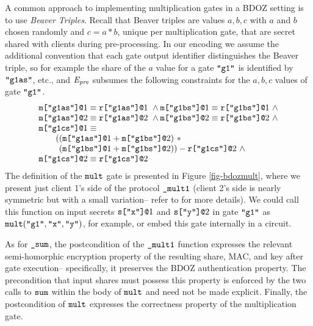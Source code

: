 A common approach to implementing multiplication gates in a BDOZ
setting is to use \emph{Beaver Triples}. Recall that Beaver triples
are values $a,b,c$ with $a$ and $b$ chosen randomly and $c = a * b$,
unique per multiplication gate, that are secret shared with clients
during pre-processing.  In our encoding we assume the additional
convention that each gate output identifier distinguishes the Beaver
triple, so for example the share of the $a$ value for a gate
$\texttt{"g1"}$ is identified by $\texttt{"g1as"}$, etc., and $\mathit{E}_{\mathit{pre}}$
subsumes the following constraints for the $a,b,c$ values of gate
$\texttt{"g1"}$.  {\footnotesize$$
\begin{array}{l}
\texttt{m[}\texttt{"g1as"}\texttt{]}\texttt{@}1 \equiv \texttt{r[}\texttt{"g1as"}\texttt{]}\texttt{@}1\ \wedge 
\texttt{m[}\texttt{"g1bs"}\texttt{]}\texttt{@}1 \equiv \texttt{r[}\texttt{"g1bs"}\texttt{]}\texttt{@}1\ \wedge\\
\texttt{m[}\texttt{"g1as"}\texttt{]}\texttt{@}2 \equiv \texttt{r[}\texttt{"g1as"}\texttt{]}\texttt{@}2\ \wedge 
\texttt{m[}\texttt{"g1bs"}\texttt{]}\texttt{@}2 \equiv \texttt{r[}\texttt{"g1bs"}\texttt{]}\texttt{@}2\ \wedge\\
\texttt{m[}\texttt{"g1cs"}\texttt{]}\texttt{@}1 \equiv \\
\qquad ((\texttt{m[}\texttt{"g1as"}\texttt{]}\texttt{@}1 + \texttt{m[}\texttt{"g1bs"}\texttt{]}\texttt{@}2)\ *\\
\qquad\phantom{(}(\texttt{m[}\texttt{"g1bs"}\texttt{]}\texttt{@}1 + \texttt{m[}\texttt{"g1bs"}\texttt{]}\texttt{@}2)) - \texttt{r[}\texttt{"g1cs"}\texttt{]}\texttt{@}2\ \wedge\\
\texttt{m[}\texttt{"g1cs"}\texttt{]}\texttt{@}2 \equiv \texttt{r[}\texttt{"g1cs"}\texttt{]}\texttt{@}2
\end{array}
$$}
The definition of the $\texttt{mult}$ gate is presented in Figure
\ref{fig-bdozmult}, where we present just client 1's side of the
protocol $\texttt{\_mult1}$ (client 2's side is nearly symmetric but with
a small variation-- refer to
\cite{evans2018pragmatic,10.1007/978-3-030-68869-1_3} for more
details).  We could call this function on input secrets
$\texttt{s[}\texttt{"x"}\texttt{]}\texttt{@}1$ and $\texttt{s[}\texttt{"y"}\texttt{]}\texttt{@}2$ in gate $\texttt{"g1"}$ as
$\texttt{mult}(\texttt{"g1"},\texttt{"x"},\texttt{"y"})$, for example, or embed
this gate internally in a circuit.

As for $\texttt{\_sum}$, the postcondition of the $\texttt{\_mult1}$
function expresses the relevant semi-homorphic encryption property of
the resulting share, MAC, and key after gate execution-- specifically,
it preserves the BDOZ authentication property. The precondition that
input shares must possess this property is enforced by the two calls
to $\texttt{sum}$ within the body of $\texttt{mult}$ and need not be made
explicit. Finally, the postcondition of $\texttt{mult}$ expresses the
correctness property of the multiplication gate.

